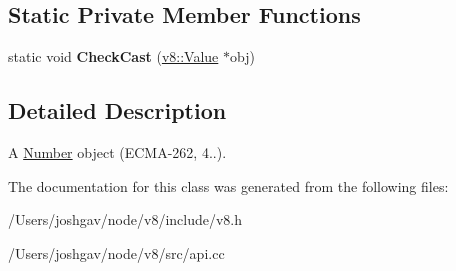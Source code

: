 \subsection*{Static Private Member Functions}
\begin{DoxyCompactItemize}
\item 
static void {\bfseries Check\+Cast} (\hyperlink{classv8_1_1_value}{v8\+::\+Value} $\ast$obj)\hypertarget{classv8_1_1_number_object_aeb7ab9979b521950db16ba4b0a3a8057}{}\label{classv8_1_1_number_object_aeb7ab9979b521950db16ba4b0a3a8057}

\end{DoxyCompactItemize}


\subsection{Detailed Description}
A \hyperlink{classv8_1_1_number}{Number} object (E\+C\+M\+A-\/262, 4..). 

The documentation for this class was generated from the following files\+:\begin{DoxyCompactItemize}
\item 
/\+Users/joshgav/node/v8/include/v8.\+h\item 
/\+Users/joshgav/node/v8/src/api.\+cc\end{DoxyCompactItemize}
